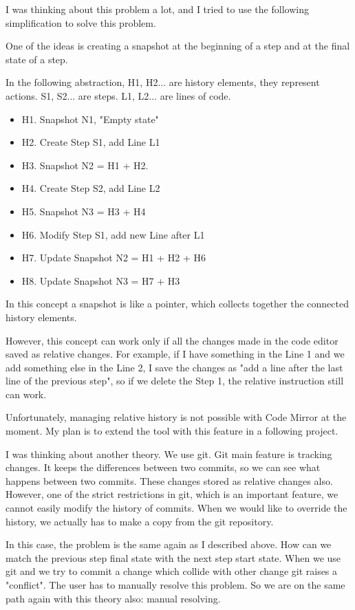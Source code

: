 \documentclass[11pt, a4paper, oneside, openright, medskipamount]{report}
\begin{document}
I was thinking about this problem a lot, and I tried to use the following simplification to solve this problem.

One of the ideas is creating a snapshot at the beginning of a step and at the final state of a step.

In the following abstraction, H1, H2... are history elements, they represent actions. S1, S2... are steps. L1, L2... are lines of code.

\begin{itemize}[noitemsep]
\item H1. Snapshot N1, "Empty state"
\item H2. Create Step S1, add Line L1
\item H3. Snapshot N2 = H1 + H2.
\item H4. Create Step S2, add Line L2
\item H5. Snapshot N3 = H3 + H4
\item H6. Modify Step S1, add new Line after L1
\item H7. Update Snapshot N2 = H1 + H2 + H6
\item H8. Update Snapshot N3 = H7 + H3
\end{itemize}

In this concept a snapshot is like a pointer, which collects together the connected history elements.

However, this concept can work only if all the changes made in the code editor saved as relative changes. For example, if I have something in the Line 1 and we add something else in the Line 2, I save the changes as "add a line after the last line of the previous step", so if we delete the Step 1, the relative instruction still can work.

Unfortunately, managing relative history is not possible with Code Mirror at the moment. My plan is to extend the tool with this feature in a following project.

I was thinking about another theory. We use git. Git main feature is tracking changes. It keeps the differences between two commits, so we can see what happens between two commits. These changes stored as relative changes also. However, one of the strict restrictions in git, which is an important feature, we cannot easily modify the history of commits. When we would like to override the history, we actually has to make a copy from the git repository.

In this case, the problem is the same again as I described above. How can we match the previous step final state with the next step start state. When we use git and we try to commit a change which collide with other change git raises a "conflict". The user has to manually resolve this problem. So we are on the same path again with this theory also: manual resolving.
\end{document}
